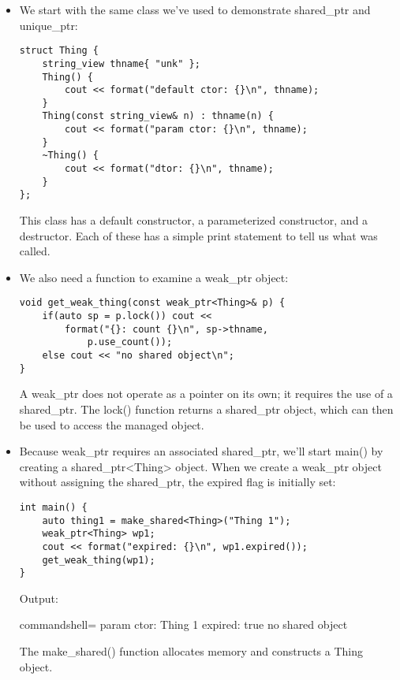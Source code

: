 \begin{itemize}
\item 
We start with the same class we've used to demonstrate shared\_ptr and unique\_ptr:

\begin{lstlisting}[style=styleCXX]
struct Thing {
	string_view thname{ "unk" };
	Thing() {
		cout << format("default ctor: {}\n", thname);
	}
	Thing(const string_view& n) : thname(n) {
		cout << format("param ctor: {}\n", thname);
	}
	~Thing() {
		cout << format("dtor: {}\n", thname);
	}
};
\end{lstlisting}

This class has a default constructor, a parameterized constructor, and a destructor. Each of these has a simple print statement to tell us what was called.

\item 
We also need a function to examine a weak\_ptr object:

\begin{lstlisting}[style=styleCXX]
void get_weak_thing(const weak_ptr<Thing>& p) {
	if(auto sp = p.lock()) cout <<
		format("{}: count {}\n", sp->thname,
			p.use_count());
	else cout << "no shared object\n";
}
\end{lstlisting}

A weak\_ptr does not operate as a pointer on its own; it requires the use of a shared\_ptr. The lock() function returns a shared\_ptr object, which can then be used to access the managed object.

\item 
Because weak\_ptr requires an associated shared\_ptr, we'll start main() by creating a shared\_ptr<Thing> object. When we create a weak\_ptr object without assigning the shared\_ptr, the expired flag is initially set:

\begin{lstlisting}[style=styleCXX]
int main() {
	auto thing1 = make_shared<Thing>("Thing 1");
	weak_ptr<Thing> wp1;
	cout << format("expired: {}\n", wp1.expired());
	get_weak_thing(wp1);
}
\end{lstlisting}

Output:

\begin{tcblisting}{commandshell={}}
param ctor: Thing 1
expired: true
no shared object
\end{tcblisting}

The make\_shared() function allocates memory and constructs a Thing object.


\end{itemize}
